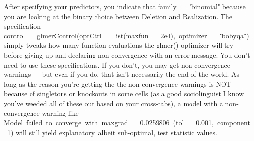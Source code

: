 \documentclass[
  10pt,
  letterpaper]{article}
\renewcommand\texttt[1]{{\ttfamily\color{BrickRed}#1}}
\begin{document}
After specifying your predictors, you indicate that
\texttt{family\ =\ "binomial"} because you are looking at the binary
choice between \texttt{Deletion} and \texttt{Realization}. The
specification
\texttt{control\ =\ glmerControl(optCtrl\ =\ list(maxfun\ =\ 2e4),\ optimizer\ =\ "bobyqa")}
simply tweaks how many function evaluations the \texttt{glmer()}
optimizer will try before giving up and declaring non-convergence with
an error message. You don't need to use these specifications. If you
don't, you may get non-convergence warnings --- but even if you do, that
isn't necessarily the end of the world. As long as the reason you're
getting the the non-convergence warnings is NOT because of singletons or
knockouts in some cells (as a good sociolinguist I know you've weeded
all of these out based on your cross-tabs), a model with a
non-convergence warning like
\texttt{Model\ failed\ to\ converge\ with\ max\textbar{}grad\textbar{}\ =\ 0.0259806\ (tol\ =\ 0.001,\ component\ 1)}
will still yield explanatory, albeit sub-optimal, test statistic values.
\end{document}

